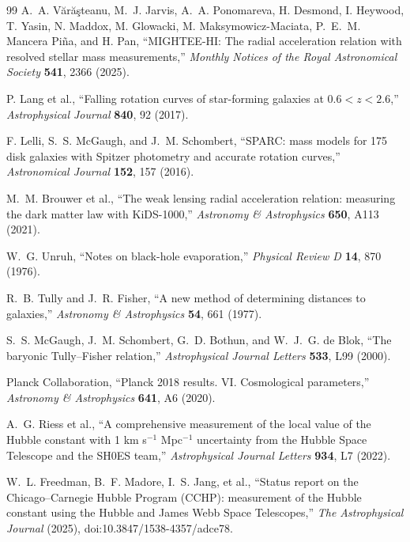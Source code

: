 \documentclass[11pt]{article}
\begin{document}
\begin{thebibliography}{99}
A.~A. V\u{a}r\u{a}\c{s}teanu, M.~J. Jarvis, A.~A. Ponomareva, H. Desmond, I. Heywood, T. Yasin, N. Maddox, M. Glowacki, M. Maksymowicz-Maciata, P.~E.~M. Mancera Pi\~na, and H. Pan,
``MIGHTEE-HI: The radial acceleration relation with resolved stellar mass measurements,''
\emph{Monthly Notices of the Royal Astronomical Society} \textbf{541}, 2366 (2025).

P. Lang et al.,
``Falling rotation curves of star-forming galaxies at $0.6<z<2.6$,''
\emph{Astrophysical Journal} \textbf{840}, 92 (2017).

F. Lelli, S.~S. McGaugh, and J.~M. Schombert,
``SPARC: mass models for 175 disk galaxies with Spitzer photometry and accurate rotation curves,''
\emph{Astronomical Journal} \textbf{152}, 157 (2016).

M.~M. Brouwer et al.,
``The weak lensing radial acceleration relation: measuring the dark matter law with KiDS-1000,''
\emph{Astronomy \& Astrophysics} \textbf{650}, A113 (2021).

W.~G. Unruh,
``Notes on black-hole evaporation,''
\emph{Physical Review D} \textbf{14}, 870 (1976).

R.~B. Tully and J.~R. Fisher,
``A new method of determining distances to galaxies,''
\emph{Astronomy \& Astrophysics} \textbf{54}, 661 (1977).

S.~S. McGaugh, J.~M. Schombert, G.~D. Bothun, and W.~J.~G. de Blok,
``The baryonic Tully--Fisher relation,''
\emph{Astrophysical Journal Letters} \textbf{533}, L99 (2000).

Planck Collaboration,
``Planck 2018 results. VI. Cosmological parameters,''
\emph{Astronomy \& Astrophysics} \textbf{641}, A6 (2020).

A.~G. Riess et al.,
``A comprehensive measurement of the local value of the Hubble constant with 1 km s$^{-1}$ Mpc$^{-1}$ uncertainty from the Hubble Space Telescope and the SH0ES team,''
\emph{Astrophysical Journal Letters} \textbf{934}, L7 (2022).

W.~L. Freedman, B.~F. Madore, I.~S. Jang, et al.,
``Status report on the Chicago--Carnegie Hubble Program (CCHP): measurement of the Hubble constant using the Hubble and James Webb Space Telescopes,''
\emph{The Astrophysical Journal} (2025), doi:10.3847/1538-4357/adce78.


\end{thebibliography}
\end{document}

